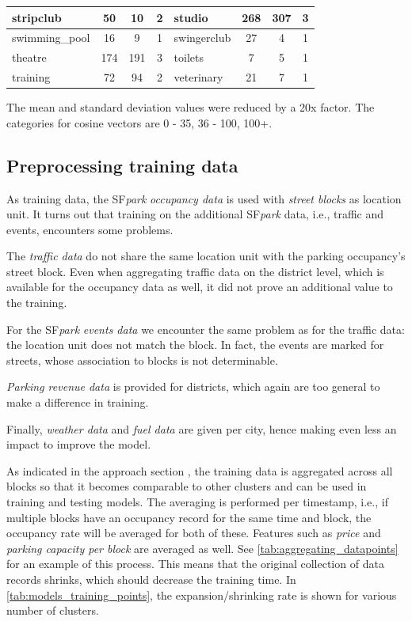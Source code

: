 \documentclass{ws-ijait}
\newcommand{\cmmnt}[1]{\ignorespaces}
\begin{document}
\begin{table}[!ht]
{\begin{tabular}{ | l | c | c | c || l | c | c | c |}
				stripclub & 50 & 10 & 2 & studio & 268 & 307 & 3 \\ \hline
				swimming\_pool & 16 & 9 & 1 & swingerclub & 27 & 4 & 1 \\ \hline
				theatre & 174 & 191 & 3 & toilets & 7 & 5 & 1 \\ \hline
				training & 72 & 94 & 2 & veterinary & 21 & 7 & 1 \\ \hline
		\end{tabular}}
		\label{tab:amenity_area_values}
		\begin{tabnote}
			The mean and standard deviation values were reduced by a 20x factor. The categories for cosine vectors are 0 - 35, 36 - 100, 100+.
		\end{tabnote}
	\end{table}
	
	\subsection{Preprocessing training data}
	As training data, the SF\textit{park} \textit{occupancy data} is used with \textit{street blocks} as location unit. 
	It turns out that training on the additional SF\textit{park} data, i.e., traffic and events, encounters some problems. 
	
	The \textit{traffic data} do not share the same location unit with the parking occupancy's street block. Even when aggregating traffic data on the district level, which is available for the occupancy data as well, it did not prove an additional value to the training. 
	
	For the SF\textit{park} \textit{events data} we encounter the same problem as for the traffic data: the location unit does not match the block. In fact, the events are marked for streets, whose association to blocks is not determinable. 
	
	\textit{Parking revenue data} is provided for districts, which again are too general to make a difference in training.
	
	Finally, \textit{weather data} and \textit{fuel data} are given per city, hence making even less an impact to improve the model.
	
	As indicated in the approach section \cmmnt{\cref{realization:machine_learning_models}}, the training data is aggregated across all blocks so that it becomes comparable to other clusters and can be used in training and testing models. The averaging is performed per timestamp, i.e., if multiple blocks have an occupancy record for the same time and block, the occupancy rate will be averaged for both of these. Features such as \textit{price} and \textit{parking capacity per block} are averaged as well. See \cref{tab:aggregating_datapoints} for an example of this process. This means that the original collection of data records shrinks, which should decrease the training time. In \cref{tab:models_training_points}, the expansion/shrinking rate is shown for various number of clusters.
	
\end{document}
